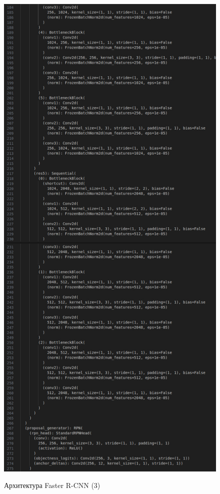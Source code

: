 \begin{figure}
    \begin{center}
	\includegraphics [scale=0.26]{my_folder/images/arch56}
	\label{fig:arch56}
	\end{center}
	\caption{Архитектура Faster R-CNN (3)}
\end{figure}

